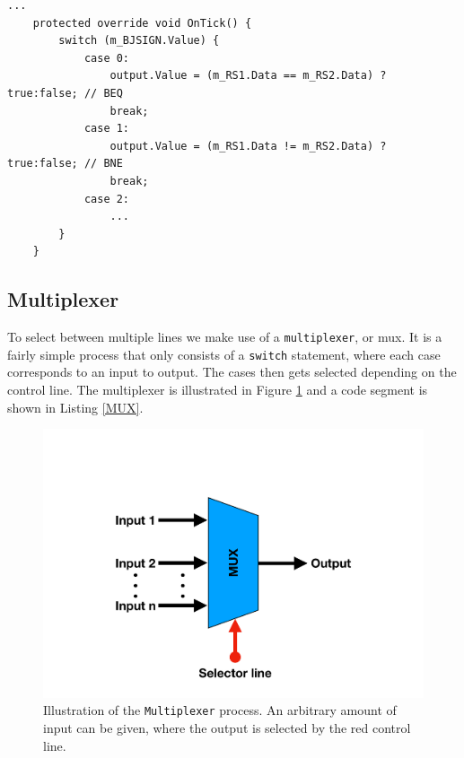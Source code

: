         \begin{minipage}{\linewidth}
            \begin{lstlisting}[language={[Sharp]C}, caption={A slice of the \texttt{GoTo} process SME code. The unit consists of a \texttt{switch} statement, where each case does the comparison relevant to the branching instruction. The conditional operator \texttt{?} is used for the comparison (the syntax goes as follows \texttt{condition ? If true return this : If false return this}).},captionpos=b, label = GOTO]
...
    protected override void OnTick() {
        switch (m_BJSIGN.Value) {
            case 0:
                output.Value = (m_RS1.Data == m_RS2.Data) ? true:false; // BEQ
                break;
            case 1:
                output.Value = (m_RS1.Data != m_RS2.Data) ? true:false; // BNE
                break;
            case 2:
                ...
        }
    }
            \end{lstlisting}
        \end{minipage}
    
    \subsection{Multiplexer}
        To select between multiple lines we make use of a \texttt{multiplexer}, or mux. It is a fairly simple process that only consists of a \texttt{switch} statement, where each case corresponds to an input to output. The cases then gets selected depending on the control line. The multiplexer is illustrated in Figure \ref{fig:MUX} and a code segment is shown in Listing \ref{MUX}.
        
        \begin{figure}[h!]
            \centering
            \includegraphics[scale=0.35]{pictures/MUX.pdf}
            \caption{Illustration of the \texttt{Multiplexer} process. An arbitrary amount of input can be given, where the output is selected by the red control line. }
            \label{fig:MUX}
        \end{figure}
    
